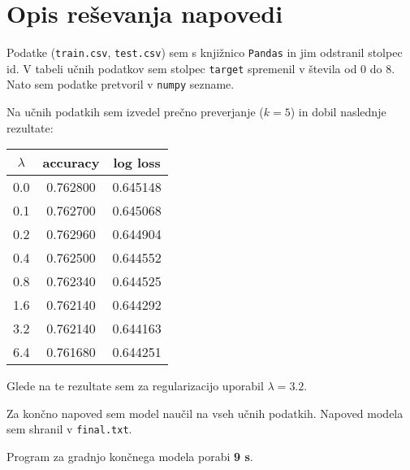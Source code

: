 \documentclass[10pt,a4paper]{article}
\begin{document}
\section*{Opis reševanja napovedi}
Podatke (\texttt{train.csv}, \texttt{test.csv}) sem s knjižnico \texttt{Pandas} in jim odstranil stolpec id. 
V tabeli učnih podatkov sem stolpec \texttt{target} spremenil v števila od $0$ do $8$. Nato sem podatke pretvoril v \texttt{numpy} sezname.

Na učnih podatkih sem izvedel prečno preverjanje ($k=5$) in dobil naslednje rezultate:
\begin{center}
	\begin{tabular}{c | c  c }
		$\lambda$ & accuracy & log loss\\ \hline
		0.0 & 0.762800 & 0.645148 \\
		0.1 & 0.762700 & 0.645068 \\
		0.2 & 0.762960 & 0.644904 \\
		0.4 & 0.762500 & 0.644552 \\
		0.8 & 0.762340 & 0.644525 \\
		1.6 & 0.762140 & 0.644292 \\
		3.2 & 0.762140 & 0.644163 \\
		6.4 & 0.761680 & 0.644251
	\end{tabular}
\end{center}

Glede na te rezultate sem za regularizacijo uporabil $\lambda = 3.2$.

Za končno napoved sem model naučil na vseh učnih podatkih. Napoved modela sem shranil v \texttt{final.txt}.

Program za gradnjo končnega modela porabi \textbf{9 s}.
\end{document}
